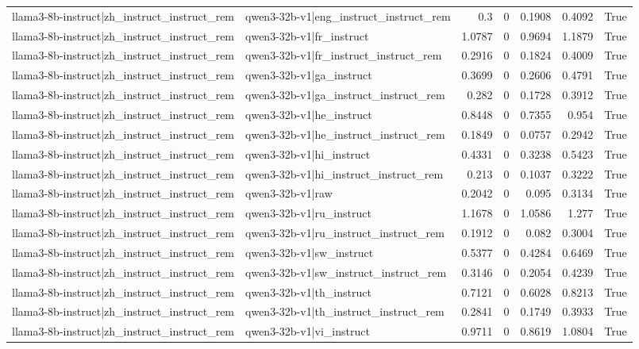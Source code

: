 \begin{table}
\begin{tabular}{l l r r r r l}
llama3-8b-instruct|zh_instruct_instruct_rem & qwen3-32b-v1|eng_instruct_instruct_rem & 0.3 & 0 & 0.1908 & 0.4092 & True \\
llama3-8b-instruct|zh_instruct_instruct_rem & qwen3-32b-v1|fr_instruct & 1.0787 & 0 & 0.9694 & 1.1879 & True \\
llama3-8b-instruct|zh_instruct_instruct_rem & qwen3-32b-v1|fr_instruct_instruct_rem & 0.2916 & 0 & 0.1824 & 0.4009 & True \\
llama3-8b-instruct|zh_instruct_instruct_rem & qwen3-32b-v1|ga_instruct & 0.3699 & 0 & 0.2606 & 0.4791 & True \\
llama3-8b-instruct|zh_instruct_instruct_rem & qwen3-32b-v1|ga_instruct_instruct_rem & 0.282 & 0 & 0.1728 & 0.3912 & True \\
llama3-8b-instruct|zh_instruct_instruct_rem & qwen3-32b-v1|he_instruct & 0.8448 & 0 & 0.7355 & 0.954 & True \\
llama3-8b-instruct|zh_instruct_instruct_rem & qwen3-32b-v1|he_instruct_instruct_rem & 0.1849 & 0 & 0.0757 & 0.2942 & True \\
llama3-8b-instruct|zh_instruct_instruct_rem & qwen3-32b-v1|hi_instruct & 0.4331 & 0 & 0.3238 & 0.5423 & True \\
llama3-8b-instruct|zh_instruct_instruct_rem & qwen3-32b-v1|hi_instruct_instruct_rem & 0.213 & 0 & 0.1037 & 0.3222 & True \\
llama3-8b-instruct|zh_instruct_instruct_rem & qwen3-32b-v1|raw & 0.2042 & 0 & 0.095 & 0.3134 & True \\
llama3-8b-instruct|zh_instruct_instruct_rem & qwen3-32b-v1|ru_instruct & 1.1678 & 0 & 1.0586 & 1.277 & True \\
llama3-8b-instruct|zh_instruct_instruct_rem & qwen3-32b-v1|ru_instruct_instruct_rem & 0.1912 & 0 & 0.082 & 0.3004 & True \\
llama3-8b-instruct|zh_instruct_instruct_rem & qwen3-32b-v1|sw_instruct & 0.5377 & 0 & 0.4284 & 0.6469 & True \\
llama3-8b-instruct|zh_instruct_instruct_rem & qwen3-32b-v1|sw_instruct_instruct_rem & 0.3146 & 0 & 0.2054 & 0.4239 & True \\
llama3-8b-instruct|zh_instruct_instruct_rem & qwen3-32b-v1|th_instruct & 0.7121 & 0 & 0.6028 & 0.8213 & True \\
llama3-8b-instruct|zh_instruct_instruct_rem & qwen3-32b-v1|th_instruct_instruct_rem & 0.2841 & 0 & 0.1749 & 0.3933 & True \\
llama3-8b-instruct|zh_instruct_instruct_rem & qwen3-32b-v1|vi_instruct & 0.9711 & 0 & 0.8619 & 1.0804 & True \\

\end{tabular}
\end{table}
